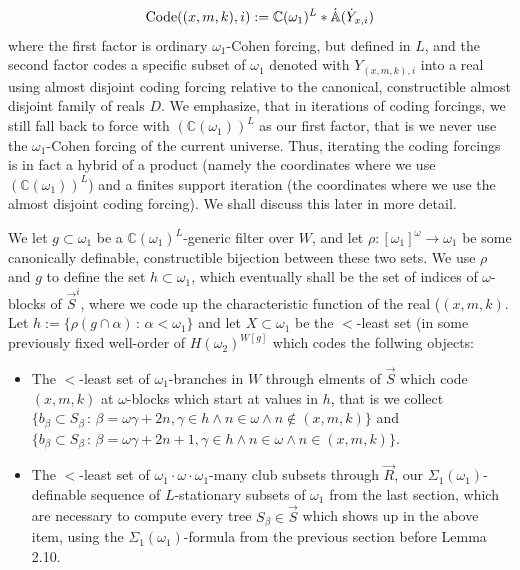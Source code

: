\documentclass[10pt,a4paper]{amsart}
\begin{document}
\[ \hbox{Code}((x,m,k),i):= \mathbb{C} (\omega_1)^L \ast \dot{\mathbb{A}} (\dot{Y}_{x,i}) \]
where the first factor is ordinary $\omega_1$-Cohen forcing, but defined in $L$, and the second factor codes a specific subset of $\omega_1$ denoted with $Y_{(x,m,k),i}$ into a real using almost disjoint coding forcing relative to the canonical, constructible almost disjoint family of reals $D$.
We emphasize, that in iterations of coding forcings, we still fall back to force with $(\mathbb{C} (\omega_1))^L$ as our first factor, that is we never use the $\omega_1$-Cohen forcing of the current universe. Thus, iterating the coding forcings is in fact a hybrid of a product (namely the coordinates where we use $(\mathbb{C}(\omega_1))^L$)  and a finites support iteration (the coordinates where we use the almost disjoint coding forcing). We shall discuss this later in more detail.

We let $g \subset \omega_1$ be a $\mathbb{C} (\omega_1)^L$-generic filter over $W$, and let $\rho: [\omega_1]^{\omega} \rightarrow \omega_1$ be some canonically definable, constructible bijection between
these two sets. We use $\rho$ and $g$ to define the set $h \subset \omega_1$, which eventually shall be the set of indices of $\omega$-blocks of $\vec{S}^i$, where we code up the characteristic function of the real ($(x,m,k)$. Let $h:= \{\rho( g \cap \alpha) \,: \, \alpha < \omega_1 \}$ and let $X \subset \omega_1$ be the $<$-least set  (in some previously fixed well-order of $H(\omega_2)^{W[g]}$ which codes the follwing objects:
\begin{itemize}
\item The $<$-least set of $\omega_1$-branches in $W$ through elments of $\vec{S}$ which code $(x,m,k)$ at $\omega$-blocks which start at values in $h$, that is  we collect $\{ b_{\beta} \subset S_{\beta} \, : \, \beta= \omega \gamma + 2n, \gamma \in h \land n \in \omega \land n \notin (x,m,k) \}$ and  $\{ b_{\beta} \subset S_{\beta} \, : \, \beta= \omega \gamma + 2n+1, \gamma \in h \land n \in \omega \land n \in (x,m,k) \}$.
\item The $<$-least set of $\omega_1 \cdot \omega \cdot \omega_1$-many club subsets through $\vec{R}$, our $\Sigma_1 (\omega_1)$-definable sequence of $L$-stationary subsets of $\omega_1$ from the last section, which are necessary to compute every tree $S_{\beta} \in \vec{S}$ which shows up in the above item, using the $\Sigma_1 (\omega_1)$-formula from the previous section before Lemma 2.10.
\end{itemize}
\end{document}
